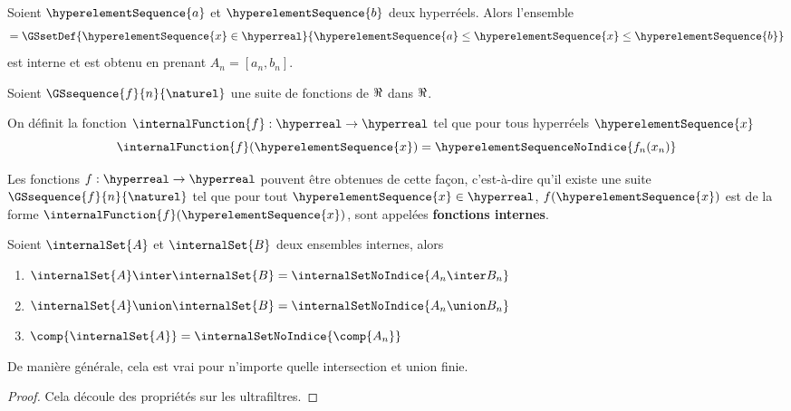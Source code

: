 \begin{exemple}
	Soient $\hyperelementSequence{a}$ et $\hyperelementSequence{b}$ deux hyperréels. Alors l'ensemble
	\begin{equation}
		[ \hyperelementSequence{a}, \hyperelementSequence{b} ] =
		\GSsetDef{\hyperelementSequence{x} \in
	\hyperreal}{\hyperelementSequence{a} \leq \hyperelementSequence{x} \leq
	\hyperelementSequence{b}}
	\end{equation}
	est interne et est obtenu en prenant $A_{n} = [a_{n}, b_{n}]$.
\end{exemple}

\begin{definition} 
	Soient $\GSsequence{f}{n}{\naturel}$ une suite de fonctions de $\real$ dans
	$\real$.

	On définit la fonction $\internalFunction{f} : \hyperreal \rightarrow
	\hyperreal$ tel que pour tous hyperréels $\hyperelementSequence{x}$
	\begin{equation}
		\internalFunction{f}(\hyperelementSequence{x}) =
		\hyperelementSequenceNoIndice{f_{n}(x_{n})}
	\end{equation}

	Les fonctions $f : \hyperreal \rightarrow \hyperreal$ pouvent être obtenues
	de cette façon, c'est-à-dire qu'il existe une suite
	$\GSsequence{f}{n}{\naturel}$ tel que pour tout $\hyperelementSequence{x}
	\in \hyperreal$,
	$f(\hyperelementSequence{x})$ est de la forme
	$\internalFunction{f}(\hyperelementSequence{x})$, sont appelées
	\textbf{fonctions internes}.
\end{definition}

\begin{proposition}
	Soient $\internalSet{A}$ et $\internalSet{B}$ deux ensembles internes,
	alors
	\begin{enumerate}
		\item $\internalSet{A} \inter \internalSet{B} = \internalSetNoIndice{A_{n}
			\inter B_{n}}$
		\item $\internalSet{A} \union \internalSet{B} = \internalSetNoIndice{A_{n}
			\union B_{n}}$
		\item $\comp{\internalSet{A}} = \internalSetNoIndice{\comp{A_{n}}}$
	\end{enumerate}

	De manière générale, cela est vrai pour n'importe quelle intersection et
	union finie.
\end{proposition}

\ifdefined\outputproof
\begin{proof}
	Cela découle des propriétés sur les ultrafiltres.
\end{proof}
\fi

